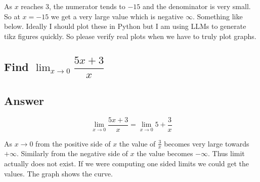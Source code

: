 \documentclass[11pt]{article}
\begin{document}
As $x$ reaches 3, the numerator tends to $-15$ and the denominator is very small. So at $x = -15$ we get a very large value 
which is negative $\infty$. Something like below. Ideally I should plot these in Python but I am using LLMs to generate tikz figures quickly. 
So please verify real plots when we have to truly plot graphs.

\begin{center}
\end{center}

\vspace{2em}


\subsection{Find $\displaystyle \lim_{x\to 0} \dfrac{5x + 3}{x}$}
\subsection*{Answer}
\[
\lim_{x\to 0} \dfrac{5x + 3}{x} = \lim_{x\to 0} 5 + \frac{3}{x}
\]

As $x \to 0$ from the positive side of $x$ the value of $\frac{3}{x}$ becomes very large towards $+\infty$.
Similarly from the negative side of $x$ the value becomes $-\infty$. Thus limit actually does not exist. 
If we were computing one sided limits we could get the values. The graph shows the curve.
\end{document}

